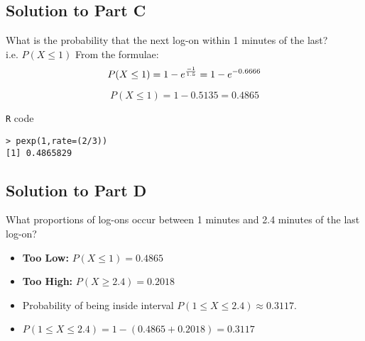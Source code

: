 \documentclass[a4paper,12pt]{article}
\begin{document}
\subsection*{Solution to Part C }



What is the probability that the next log-on within 1 minutes of the last?\\
i.e. $P(X \leq 1)$
\bigskip
From the formulae:
\[
P( X \leq 1) = 1 - e^{{-1 \over 1.5}} = 1 -  e^{-0.6666}
\]

\[
P( X \leq 1) = 1 -  0.5135  = 0.4865
\]
\begin{framed}
\noindent \texttt{R} code 

\begin{verbatim}
> pexp(1,rate=(2/3))
[1] 0.4865829
\end{verbatim}
\end{framed}

\subsection*{Solution to Part D}



What proportions of log-ons occur between 1 minutes and 2.4 minutes of the last log-on?

\begin{itemize}
\item \textbf{Too Low:} $P(X \leq 1) = 0.4865$
\item \textbf{Too High:} $P(X \geq 2.4) = 0.2018$
\item Probability of being inside interval $P(1 \leq X \leq 2.4) \approx 0.3117$.
\item $P(1 \leq X \leq 2.4) = 1- ( 0.4865 + 0.2018) = 0.3117$
\end{itemize}
\end{document}

